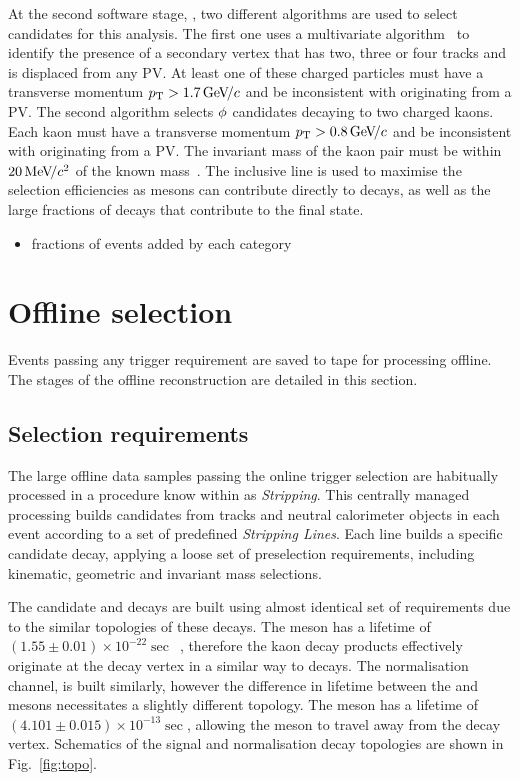 At the second software stage, \hlttwo, two different algorithms are used to select candidates for this analysis.
The first one uses a multivariate algorithm~\cite{BBDT} to identify the presence of a secondary vertex that has two, three or four tracks and is displaced from any PV. At least one of these charged particles must have a transverse momentum $\mbox{$p_{\mathrm{ T}}$} > 1.7{\mathrm{\,Ge\kern -0.1em V\!/}c}$ and be inconsistent with originating from a PV. 
The second algorithm selects $\phi$ candidates decaying to two charged kaons. Each kaon must have a transverse momentum $\mbox{$p_{\mathrm{ T}}$} > 0.8{\mathrm{\,Ge\kern -0.1em V\!/}c}$ and be inconsistent with originating from a PV. The invariant mass of the kaon pair must be within $20{\mathrm{\,Me\kern -0.1em V\!/}c^2}$ of the known \phiz mass~\cite{PDG2016}.
The inclusive \phiz line is used to maximise the selection efficiencies as \phiz mesons can contribute directly to \decay{\Bp}{\Dsp\phiz} decays, as well as the large fractions of \decay{\Dsp}{\phiz\pip} decays that contribute to the \decay{\Dsp}{\Kp\Km\pip} final state.

{\color{Red}
\begin{itemize}
\item fractions of events added by each category
\end{itemize}
}

\section{Offline selection}

Events passing any trigger requirement are saved to tape for processing offline. The stages of the offline reconstruction are detailed in this section.

\subsection{Selection requirements}

The large offline data samples passing the online trigger selection are habitually processed in a procedure know within \lhcb as \emph{Stripping}. This centrally managed processing builds candidates from tracks and neutral calorimeter objects in each event according to a set of predefined \emph{Stripping Lines}. Each line builds a specific candidate decay, applying a loose set of preselection requirements, including kinematic, geometric and invariant mass selections. 

The candidate \decay{\Bp}{\Dsp\phiz} and \decay{\Bp}{\Dsp\Kp\Km} decays are built using almost identical set of requirements due to the similar topologies of these decays. The \phiz meson has a lifetime of $(1.55\pm0.01)\times10^{-22}\sec$~\cite{PDG2016}, therefore the kaon decay products effectively originate at the \Bp decay vertex in a similar way to \decay{\Bp}{\Dsp\Kp\Km} decays.  The normalisation channel, \decay{\Bp}{\Dsp\Dzb} is built similarly, however the difference in lifetime between the \Dzb and \phiz mesons necessitates a slightly different topology. The \Dzb meson has a lifetime of $(4.101\pm0.015)\times10^{-13}\sec$, allowing the meson to travel away from the \Bp decay vertex. Schematics of the signal and normalisation decay topologies are shown in Fig.~\ref{fig:topo}.

